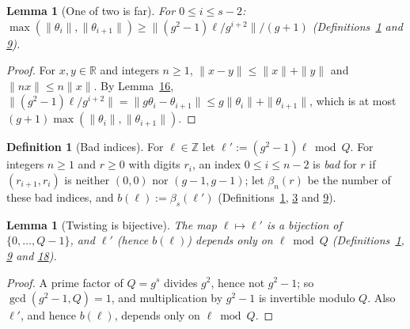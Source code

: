 \documentclass[11pt]{article}
\newcounter{hffc}
\theoremstyle{definition}\newtheorem{hffdef}[hffc]{Definition}
\theoremstyle{plain}\newtheorem{hfflem}[hffc]{Lemma}\newtheorem{hffthm}[hffc]{Theorem}
\theoremstyle{remark}\newtheorem{hffrem}[hffc]{Remark}
\newcommand{\hffcost}{}
\newcommand{\setcost}[1]{\renewcommand{\hffcost}{#1}}
\newcommand{\Z}{\mathbb{Z}}\newcommand{\R}{\mathbb{R}}\newcommand{\N}{\mathbb{N}}
\begin{document}
\begin{hfflem}[One of two is far]\label{L:far2}
For $0\le i\le s-2$: $\max(\|\theta_i\|,\|\theta_{i+1}\|)\ge\|(g^2-1)\ell/g^{i+2}\|/(g+1)$ (Definitions~\hyperref[D:conv]{1} and \hyperref[D:psi]{9}).
\par\nopagebreak{}
\end{hfflem}
\begin{proof}\setcost{length 133/300}For $x,y\in\R$ and integers $n\ge1$, $\|x-y\|\le\|x\|+\|y\|$ and $\|nx\|\le n\|x\|$. By Lemma~\hyperref[L:ident]{16}, $\|(g^2-1)\ell/g^{i+2}\|=\|g\theta_i-\theta_{i+1}\|\le g\|\theta_i\|+\|\theta_{i+1}\|$, which is at most $(g+1)\max(\|\theta_i\|,\|\theta_{i+1}\|)$.
\end{proof}

\begin{hffdef}[Bad indices]\label{D:bad}
For $\ell\in\Z$ let $\ell':=(g^2-1)\ell\bmod Q$. For integers $n\ge1$ and $r\ge0$ with digits $r_i$, an index $0\le i\le n-2$ is \emph{bad} for $r$ if $(r_{i+1},r_i)$ is neither $(0,0)$ nor $(g-1,g-1)$; let $\beta_n(r)$ be the number of these bad indices, and $b(\ell):=\beta_s(\ell')$ (Definitions~\hyperref[D:conv]{1}, \hyperref[D:digits]{3} and \hyperref[D:psi]{9}).
\par\nopagebreak{}
\end{hffdef}

\begin{hfflem}[Twisting is bijective]\label{L:twist}
The map $\ell\mapsto\ell'$ is a bijection of $\{0,\dots,Q-1\}$, and $\ell'$ (hence $b(\ell)$) depends only on $\ell\bmod Q$ (Definitions~\hyperref[D:conv]{1}, \hyperref[D:psi]{9} and \hyperref[D:bad]{18}).
\par\nopagebreak{}
\end{hfflem}
\begin{proof}\setcost{length 139/300}A prime factor of $Q=g^s$ divides $g^2$, hence not $g^2-1$; so $\gcd(g^2-1,Q)=1$, and multiplication by $g^2-1$ is invertible modulo $Q$. Also $\ell'$, and hence $b(\ell)$, depends only on $\ell\bmod Q$.
\end{proof}
\end{document}
